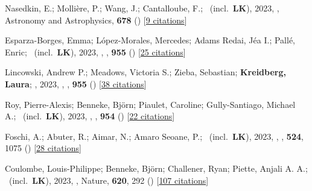 \item[{\color{numcolor}\scriptsize96}] Nasedkin, E.; Molli{\`e}re, P.; Wang, J.; Cantalloube, F.; \etal\ (incl.\ \textbf{LK}), 2023, , Astronomy and Astrophysics, \textbf{678} () [\href{https://ui.adsabs.harvard.edu/abs/2023A&A...678A..41N}{9 citations}]

\item[{\color{numcolor}\scriptsize95}] Esparza-Borges, Emma; L{\'o}pez-Morales, Mercedes; Adams Redai, J{\'e}a I.; Pall{\'e}, Enric; \etal\ (incl.\ \textbf{LK}), 2023, , \apj, \textbf{955} () [\href{https://ui.adsabs.harvard.edu/abs/2023ApJ...955L..19E}{25 citations}]

\item[{\color{numcolor}\scriptsize94}] Lincowski, Andrew P.; Meadows, Victoria S.; Zieba, Sebastian; \textbf{Kreidberg, Laura}; \etal, 2023, , \apj, \textbf{955} () [\href{https://ui.adsabs.harvard.edu/abs/2023ApJ...955L...7L}{38 citations}]

\item[{\color{numcolor}\scriptsize93}] Roy, Pierre-Alexis; Benneke, Bj{\"o}rn; Piaulet, Caroline; Gully-Santiago, Michael A.; \etal\ (incl.\ \textbf{LK}), 2023, , \apj, \textbf{954} () [\href{https://ui.adsabs.harvard.edu/abs/2023ApJ...954L..52R}{22 citations}]

\item[{\color{numcolor}\scriptsize92}] Foschi, A.; Abuter, R.; Aimar, N.; Amaro Seoane, P.; \etal\ (incl.\ \textbf{LK}), 2023, , \mnras, \textbf{524}, 1075 () [\href{https://ui.adsabs.harvard.edu/abs/2023MNRAS.524.1075F}{28 citations}]

\item[{\color{numcolor}\scriptsize91}] Coulombe, Louis-Philippe; Benneke, Bj{\"o}rn; Challener, Ryan; Piette, Anjali A. A.; \etal\ (incl.\ \textbf{LK}), 2023, , Nature, \textbf{620}, 292 () [\href{https://ui.adsabs.harvard.edu/abs/2023Natur.620..292C}{107 citations}]

